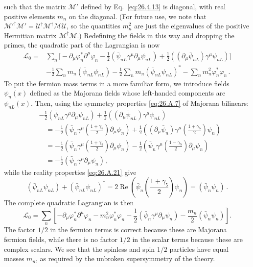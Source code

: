 such that the matrix \(\mathcal{M}'\) defined by Eq.~\eqref{eq:26.4.13} is
diagonal, with real positive elements \(m_n\) on the diagonal. (For future
use, we note that
\(\mathcal{M}'^\dagger\mathcal{M}'=
\mathcal{U}^\dagger\mathcal{M}^\dagger\mathcal{M}\mathcal{U}\), so the
quantities \(m_n^2\) are just the eigenvalues of the positive Hermitian matrix
\(\mathcal{M}^\dagger\mathcal{M}\).) Redefining the fields in this way and
dropping the primes, the quadratic part of the Lagrangian is now
\begin{equation}
  \begin{aligned}
  \mathcal{L}_0={}&
  \sum_n\biggl[
    -\partial_\mu\varphi_n^*\partial^\mu\varphi_n
    -\frac12(\bar\psi_{nL}\gamma^\mu\partial_\mu\psi_{nL})
    +\frac12((\partial_\mu\bar\psi_{nL})\gamma^\mu\psi_{nL})
  \biggr]
  \\
  &-\frac12\sum_n m_n(\bar\psi_{nL}\psi_{nL})
  -\frac12\sum_n m_n(\bar\psi_{nL}\psi_{nL})^*
  -\sum_n m_n^2\varphi_n^*\varphi_n\,.
  \end{aligned}
  \tag{26.4.14}\label{eq:26.4.14}
\end{equation}
To put the fermion mass terms in a more familiar form, we introduce fields
\(\psi_n(x)\) defined as the Majorana fields whose left-handed components are
\(\psi_{nL}(x)\). Then, using the symmetry properties \eqref{eq:26.A.7} of
Majorana bilinears:
\[
  \begin{aligned}
  &-\frac12(\bar\psi_{nL}\gamma^\mu\partial_\mu\psi_{nL})
  +\frac12((\partial_\mu\bar\psi_{nL})\gamma^\mu\psi_{nL})
  \\
  &\quad=
  -\frac12\left(\bar\psi_n\gamma^\mu
    \left(\frac{1+\gamma_5}{2}\right)\partial_\mu\psi_n\right)
  +\frac12\left((\partial_\mu\bar\psi_n)\gamma^\mu
    \left(\frac{1+\gamma_5}{2}\right)\psi_n\right)
  \\
  &\quad=
  -\frac12\left(\bar\psi_n\gamma^\mu
    \left(\frac{1+\gamma_5}{2}\right)\partial_\mu\psi_n\right)
  -\frac12\left(\bar\psi_n\gamma^\mu
    \left(\frac{1-\gamma_5}{2}\right)\partial_\mu\psi_n\right)
  \\
  &\quad=-\frac12(\bar\psi_n\gamma^\mu\partial_\mu\psi_n)\,,
  \end{aligned}
\]
while the reality properties \eqref{eq:26.A.21} give
\[
  (\bar\psi_{nL}\psi_{nL})
  +(\bar\psi_{nL}\psi_{nL})^*
  =2\operatorname{Re}\left(
    \bar\psi_n\left(\frac{1+\gamma_5}{2}\right)\psi_n
  \right)
  =(\bar\psi_n\psi_n)\,.
\]
The complete quadratic Lagrangian is then
\begin{equation}
  \mathcal{L}_0
  =\sum_n\left[
    -\partial_\mu\varphi_n^*\partial^\mu\varphi_n
    -m_n^2\varphi_n^*\varphi_n
    -\frac12(\bar\psi_n\gamma^\mu\partial_\mu\psi_n)
    -\frac{m_n}{2}(\bar\psi_n\psi_n)
  \right].
  \tag{26.4.15}\label{eq:26.4.15}
\end{equation}
The factor \(1/2\) in the fermion terms is correct because these are Majorana
fermion fields, while there is no factor \(1/2\) in the scalar terms because
these are complex scalars. We see that the spinless and spin \(1/2\) particles
have equal masses \(m_n\), as required by the unbroken supersymmetry of the
theory.

